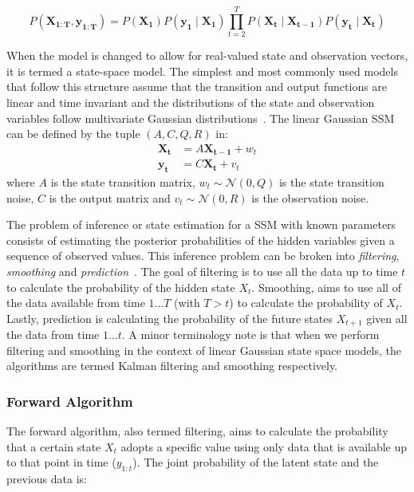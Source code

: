 \begin{equation}\label{eq:joint_prob_ssm}
  P(\mathbf{X_{1:T}}, \mathbf{y_{1:T}}) = P(\mathbf{X_1})P(\mathbf{y_1} \mid \mathbf{X_1}) \prod\limits_{t=2}^{T} P(\mathbf{X_t} \mid \mathbf{X_{t-1}} ) P( \mathbf{y_t} \mid \mathbf{X_{t}} )
\end{equation}

When the model is changed to allow for real-valued state and observation vectors, it is termed a state-space model. The simplest and most commonly used models that follow this structure assume that the transition and output functions are linear and time invariant and the distributions of the state and observation variables follow multivariate Gaussian distributions~\citep{ghahramani2000variational}. The linear Gaussian SSM can be defined by the tuple $(A, C, Q, R)$ in:
\begin{equation}\label{eq:hmm_first_order}
  \begin{split}
      \mathbf{X_t} &= A\mathbf{X_{t-1}} + w_t \\
      \mathbf{y_t} &= C\mathbf{X_t} + v_t
  \end{split}
\end{equation}
where $A$ is the state transition matrix, $w_t \sim \mathcal{N}(0,Q)$ is the state transition noise, $C$ is the output matrix and $v_t \sim \mathcal{N}(0,R)$ is the observation noise.

The problem of inference or state estimation for a SSM with known parameters consists of estimating the posterior probabilities of the hidden variables given a sequence of observed values. This inference problem can be broken into \textit{filtering}, \textit{smoothing} and \textit{prediction}~\citep{shumway2000time}. The goal of filtering is to use all the data up to time $t$ to calculate the probability of the hidden state $X_t$. Smoothing, aims to use all of the data available from time $1 \hdots T$ (with $T > t$) to calculate the probability of $X_t$. Lastly, prediction is calculating the probability of the future states $X_{t+1}$ given all the data from time $1 \hdots t$. A minor terminology note is that when we perform filtering and smoothing in the context of linear Gaussian state space models, the algorithms are termed Kalman filtering and smoothing respectively.

\subsubsection{Forward Algorithm}
The forward algorithm, also termed filtering, aims to calculate the probability that a certain state $X_t$ adopts a specific value using only data that is available up to that point in time ($y_{1:t}$). The joint probability of the latent state and the previous data is:

